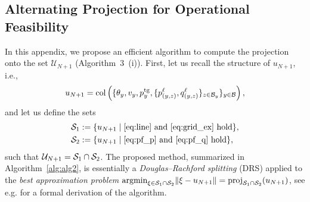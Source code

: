 \subsection{Alternating Projection for Operational Feasibility}
\label{APA}
In this appendix, we propose an efficient algorithm to compute the projection onto the set $\mathcal{U}_{N+1}$  (Algorithm~3~(i)). First, let us recall the structure of $u_{N+1}$, i.e.,
$$u_{N+1}=\operatorname{col}\left(\{\theta_y, v_y, p_y^{\mathrm{tg}},\{p_{(y,z)}^{\ell},q_{(y,z)}^{\ell}\}_{z \in \mathcal B_y} \}_{y\in\mathcal B} \right),$$ and let us define the sets
\begin{align}
	\mathcal S_1 &:= \{u_{N+1} \mid \text{\eqref{eq:line} and \eqref{eq:grid_ex} hold}\},\\
	\mathcal S_2 &:= \{u_{N+1} \mid \text{\eqref{eq:pf_p} and \eqref{eq:pf_q} hold}\},
\end{align}
such that $\mathcal{U}_{N+1} = \mathcal S_1 \cap \mathcal S_2$. 
%
The proposed method, summarized in Algorithm~\ref{alg:alg2}, is essentially a \textit{Douglas--Rachford splitting} (DRS) \cite[\S~26.3]{bauschke2011convex} applied to the \textit{best approximation problem} $ {\operatorname{argmin}}_{\xi \in \mathcal S_1 \cap \mathcal S_2}  \|\xi-u_{N+1}\| =\mathrm{proj}_{\mathcal S_1 \cap \mathcal S_2}(u_{N+1}) $, see e.g. \cite[\S~4.3]{bauschke2015projection} for a formal derivation of the algorithm.

